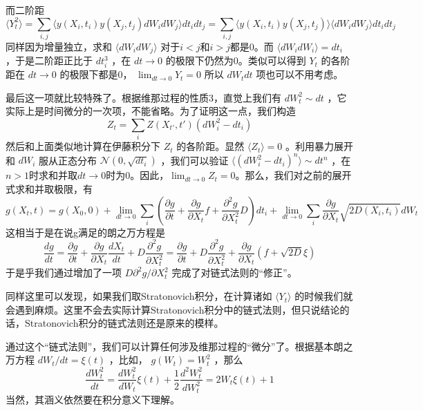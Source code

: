 \documentclass{ctexart}
\begin{document}
而二阶距
\begin{equation}
\langle Y^2_t\rangle=\sum_{i,j}\langle y(X_i,t_i)y(X_j,t_j)dW_idW_j\rangle dt_idt_j=\sum_{i,j}\langle y(X_i,t_i)y(X_j,t_j)\rangle\langle dW_idW_j\rangle dt_idt_j
\end{equation}
同样因为增量独立，求和 $\langle dW_idW_j\rangle$ 对于$i<j$和$i>j$都是0。而 $\langle dW_idW_i\rangle=dt_i$ ，于是二阶距正比于 $dt_i^3$ ，在 $dt\to0$ 的极限下仍然为0。类似可以得到 $Y_t$ 的各阶距在 $dt\to0$ 的极限下都是0， $\lim_{dt\to 0}Y_t=0$ 所以 $dW_tdt$ 项也可以不用考虑。

最后这一项就比较特殊了。根据维那过程的性质3，直觉上我们有 $dW_t^2\sim dt$ ，它实际上是时间微分的一次项，不能省略。为了证明这一点，我们构造
\begin{equation}
Z_t=\sum_i Z(X_{t'},t')(dW_i^2-dt_i)
\end{equation}
然后和上面类似地计算在伊藤积分下 $Z_t$ 的各阶距。显然 $\langle Z_t\rangle=0$ 。利用暴力展开和 $dW_i$ 服从正态分布 $\mathcal{N}(0,\sqrt{dt_i})$ ，我们可以验证 $\langle(dW_i^2-dt_i)^n\rangle\sim dt^n$ ，在$n>1$时求和并取$dt\to0$时为0。因此，$\lim_{dt\to 0}Z_t=0$。那么，我们对之前的展开式求和并取极限，有
\begin{equation}
g(X_t,t)=g(X_0,0)+\lim_{dt\to 0}\sum_i\left(\frac{\partial g}{\partial t}+\frac{\partial g}{\partial X_t}f+\frac{\partial^2g}{\partial X_t^2}D\right)dt_i+\lim_{dt\to 0}\sum_i\frac{\partial g}{\partial X_t}\sqrt{2D(X_i,t_i)}dW_t
\end{equation}
这相当于是在说g满足的朗之万方程是
\begin{equation}
\frac{dg}{dt}=\frac{\partial g}{\partial t}+\frac{\partial g}{\partial X_t}\frac{dX_t}{dt}+D\frac{\partial^2 g}{\partial X_t^2}=\frac{\partial g}{\partial t}+D\frac{\partial^2 g}{\partial X_t^2}+\frac{\partial g}{\partial X_t}(f+\sqrt{2D}\xi)
\end{equation}
于是乎我们通过增加了一项 $D\partial^2g/\partial X_t^2$ 完成了对链式法则的“修正”。

同样这里可以发现，如果我们取Stratonovich积分，在计算诸如 $\langle Y_t\rangle$ 的时候我们就会遇到麻烦。这里不会去实际计算Stratonovich积分中的链式法则，但只说结论的话，Stratonovich积分的链式法则还是原来的模样。

通过这个“链式法则”，我们可以计算任何涉及维那过程的“微分”了。根据基本朗之万方程 $dW_t/dt=\xi(t)$ ，比如， $g(W_t)=W_t^2$ ，那么
\begin{equation}
\frac{d W_t^2}{dt}=\frac{d W_t^2}{dW_t}\xi(t)+\frac{1}{2}\frac{d^2W_t^2}{dW_t^2}=2W_t\xi(t)+1
\end{equation}
当然，其涵义依然要在积分意义下理解。
\end{document}

